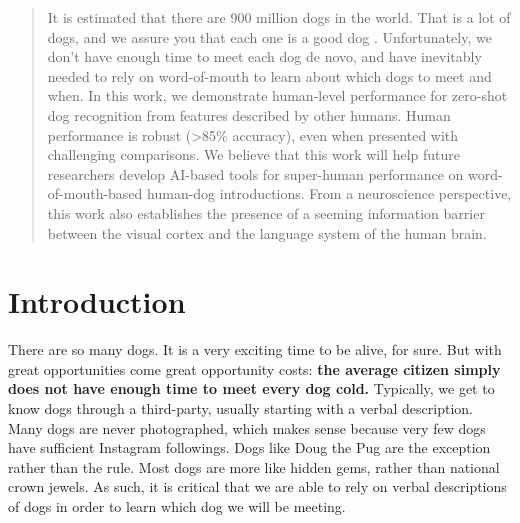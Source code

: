 \documentclass[sigplan,10pt]{acmart}
\begin{document}
\begin{abstract}
It is estimated that there are 900 million dogs in the world. That is a lot of dogs, and we assure you that each one is a good dog \cite{dog-rates}. Unfortunately, we don't have enough time to meet each dog de novo, and have inevitably needed to rely on word-of-mouth to learn about which dogs to meet and when. In this work, we demonstrate human-level performance for zero-shot dog recognition from features described by other humans. Human performance is robust (>85\% accuracy), even when presented with challenging comparisons. We believe that this work will help future researchers develop AI-based tools for super-human performance on word-of-mouth-based human-dog introductions. From a neuroscience perspective, this work also establishes the presence of a seeming information barrier between the visual cortex and the language system of the human brain.
\end{abstract}







\maketitle



\section{Introduction}
There are so many dogs. It is a very exciting time to be alive, for sure. But with great opportunities come great opportunity costs: \textbf{the average citizen simply does not have enough time to meet every dog cold.} Typically, we get to know dogs through a third-party, usually starting with a verbal description. Many dogs are never photographed, which makes sense because very few dogs have sufficient Instagram followings. Dogs like Doug the Pug \cite{doug-the-pug} are the exception rather than the rule. Most dogs are more like hidden gems, rather than national crown jewels. As such, it is critical that we are able to rely on verbal descriptions of dogs in order to learn which dog we will be meeting.
\end{document}
